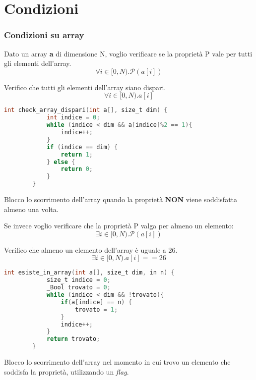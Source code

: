 \section{Condizioni}
\subsubsection{Condizioni su array}
Dato un array \textbf{a} di dimensione N, voglio verificare se la proprietà P vale per tutti gli elementi dell'array.
\begin{equation}
	\forall i \in [0, N).\mathcal{P}(a[i])
\end{equation}
\begin{example}
	Verifico che tutti gli elementi dell'array siano dispari.
	\begin{equation}
		\forall i \in [0, N).a[i]%
	\end{equation}
	\begin{lstlisting}[language=C, caption=Verifica di proprietà su tutti gli elementi mathescape=true]
		int check_array_dispari(int a[], size_t dim) {
			int indice = 0;
			while (indice < dim && a[indice]%2 == 1){
				indice++;
			}
			if (indice == dim) {
				return 1;
			} else {
				return 0;
			}	
		}
	\end{lstlisting}
	Blocco lo scorrimento dell'array quando la proprietà \textbf{NON} viene soddisfatta almeno una volta.
\end{example}

\noindent
Se invece voglio verificare che la proprietà P valga per almeno un elemento:
\begin{equation}
	\exists i \in [0, N).\mathcal{P}(a[i])
\end{equation}
\begin{example}
	Verifico che almeno un elemento dell'array è uguale a 26.
	\begin{equation}
		\exists i \in [0, N).a[i]==26
	\end{equation}
	\begin{lstlisting}[language=C, caption=Verifica di proprietà su almeno un elemento, mathescape=true]
		int esiste_in_array(int a[], size_t dim, in n) {
			size_t indice = 0;
			_Bool trovato = 0;
			while (indice < dim && !trovato){
				if(a[indice] == n) {
					trovato = 1;	
				}
				indice++;
			}
			return trovato;
		}
	\end{lstlisting}
	Blocco lo scorrimento dell'array nel momento in cui trovo un elemento che soddisfa la proprietà, utilizzando un \textit{flag}.
\end{example}
